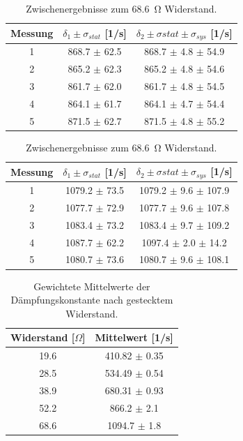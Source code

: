 \documentclass[12pt,a4paper]{article}
\begin{document}
\begin{table}
	\caption{Zwischenergebnisse zum \SI{52.2}{\ohm} Widerstand.}
	\begin{tabular}{|c|c|c|}
		\hline
		Messung & $\delta_1 \pm \sigma_{stat}$ [1/s] & $\delta_2 \pm \sigma{stat} \pm \sigma_{sys}$ [1/s] \\
		\hline
		1 & 868.7 $\pm$ 62.5 & 868.7 $\pm$ 4.8 $\pm$ 54.9 \\
		\hline
		2 & 865.2 $\pm$ 62.3 & 865.2 $\pm$ 4.8 $\pm$ 54.6 \\
		\hline
		3 & 861.7 $\pm$ 62.0 & 861.7 $\pm$ 4.8 $\pm$ 54.5 \\
		\hline
		4 & 864.1 $\pm$ 61.7 & 864.1 $\pm$ 4.7 $\pm$ 54.4 \\
		\hline
		5 & 871.5 $\pm$ 62.7 & 871.5 $\pm$ 4.8 $\pm$ 55.2 \\
		\hline
	\end{tabular}
	
	\caption{Zwischenergebnisse zum \SI{68.6}{\ohm} Widerstand.}
	\label{tab:delta_zwischenwerte_ende}
	\begin{tabular}{|c|c|c|}
		\hline
		Messung & $\delta_1 \pm \sigma_{stat}$ [1/s] & $\delta_2 \pm \sigma{stat} \pm \sigma_{sys}$ [1/s] \\
		\hline
		1 & 1079.2 $\pm$ 73.5 & 1079.2 $\pm$ 9.6 $\pm$ 107.9 \\
		\hline
		2 & 1077.7 $\pm$ 72.9 & 1077.7 $\pm$ 9.6 $\pm$ 107.8 \\
		\hline
		3 & 1083.4 $\pm$ 73.2 & 1083.4 $\pm$ 9.7 $\pm$ 109.2 \\
		\hline
		4 & 1087.7 $\pm$ 62.2 & 1097.4 $\pm$ 2.0 $\pm$ 14.2 \\
		\hline
		5 & 1080.7 $\pm$ 73.6 & 1080.7 $\pm$ 9.6 $\pm$ 108.1 \\
		\hline
	\end{tabular}
\end{table}


\begin{table}
	\centering
	\caption{Gewichtete Mittelwerte der Dämpfungskonstante nach gestecktem Widerstand.}
		\label{tab:delta}
	\begin{tabular}{|c|c|}
		\hline
		\textbf{Widerstand [$\Omega$]} & \textbf{Mittelwert [1/s]} \\
		\hline
		19.6 & 410.82 $\pm$ 0.35 \\
		\hline
		28.5 & 534.49 $\pm$ 0.54 \\
		\hline
		38.9 & 680.31 $\pm$ 0.93 \\
		\hline
		52.2 & 866.2 $\pm$ 2.1 \\
		\hline
		68.6 & 1094.7 $\pm$ 1.8 \\
		\hline
	\end{tabular}
\end{table}
\end{document}
